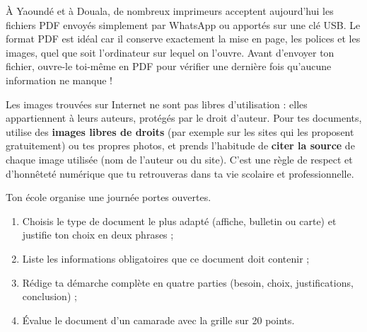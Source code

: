 \documentclass[11pt]{article}
\newcommand{\cle}[1]{{\popxbold\color{popdark}#1}}
\begin{document}
\begin{savaistu}
À Yaoundé et à Douala, de nombreux imprimeurs acceptent aujourd'hui les fichiers \cle{PDF} envoyés simplement par WhatsApp ou apportés sur une clé USB. Le format PDF est idéal car il conserve exactement la mise en page, les polices et les images, quel que soit l'ordinateur sur lequel on l'ouvre. Avant d'envoyer ton fichier, ouvre-le toi-même en PDF pour vérifier une dernière fois qu'aucune information ne manque !
\end{savaistu}

\begin{savaistu}
Les images trouvées sur Internet ne sont pas libres d'utilisation : elles appartiennent à leurs auteurs, protégés par le \cle{droit d'auteur}. Pour tes documents, utilise des \textbf{images libres de droits} (par exemple sur les sites qui les proposent gratuitement) ou tes propres photos, et prends l'habitude de \textbf{citer la source} de chaque image utilisée (nom de l'auteur ou du site). C'est une règle de respect et d'honnêteté numérique que tu retrouveras dans ta vie scolaire et professionnelle.
\end{savaistu}

\begin{exercice}
Ton école organise une journée portes ouvertes.
\begin{enumerate}
  \item Choisis le type de document le plus adapté (affiche, bulletin ou carte) et justifie ton choix en deux phrases ;
  \item Liste les informations obligatoires que ce document doit contenir ;
  \item Rédige ta démarche complète en quatre parties (besoin, choix, justifications, conclusion) ;
  \item Évalue le document d'un camarade avec la grille sur 20 points.
\end{enumerate}
\end{exercice}
\end{document}
